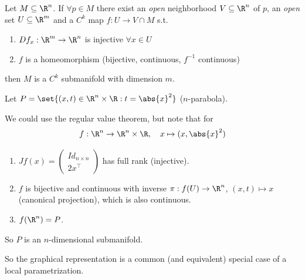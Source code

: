 \begin{theorem*}
Let $M \subseteq \R^n$. If $\forall p \in M$ there exist an \emph{open} neighborhood $V \subseteq \R^n$ of $p$, an \emph{open} set $U \subseteq \R^m$ and a $C^k$ map $f: U \to V \cap M$ s.t.
\begin{enumerate}
    \item $Df_x: \R^m \to \R^n$ is injective $\forall x \in U$
    \item $f$ is a homeomorphism (bijective, continuous, $f^{-1}$ continuous)
\end{enumerate}
then $M$ is a $C^k$ submanifold with dimension $m$.
\end{theorem*}

\begin{example*}[Parabola]
Let $P = \set{(x,t) \in \R^n \times \R : t = \abs{x}^2}$ \textcolor{eGray}{($n$-parabola)}.

\begin{center}
\end{center}

We could use the regular value theorem, but note that for
\[ f: \R^n \to \R^n \times \R, \quad x \mapsto (x, \abs{x}^2) \]
\begin{enumerate}
    \item $Jf(x) = \begin{pmatrix} Id_{n \times n} \\ 2x^\top \end{pmatrix}$ has full rank (injective).
    \item $f$ is bijective and continuous with inverse $\pi: f(U) \to \R^n$, $(x,t) \mapsto x$ (canonical projection), which is also continuous.
    \item $f(\R^n) = P$.
\end{enumerate}
So $P$ is an $n$-dimensional submanifold.
\end{example*}

\textcolor{eGray}{So the graphical representation is a common (and equivalent) special case of a local parametrization.}

